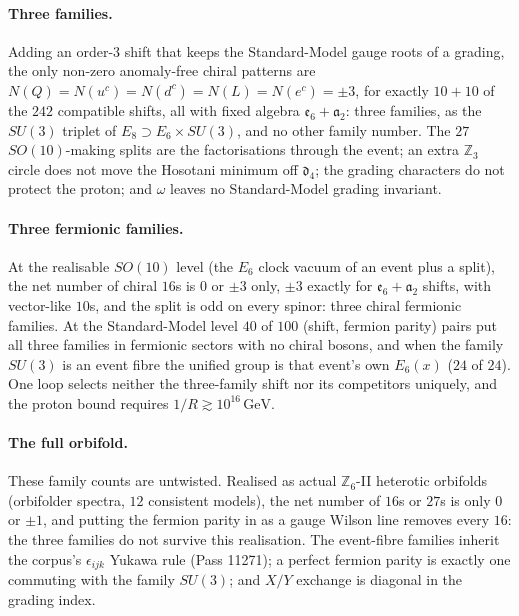 \paragraph{Three families.}
Adding an order-$3$ shift that keeps the Standard-Model gauge roots of a grading, the only non-zero anomaly-free
chiral patterns are $N(Q)=N(u^c)=N(d^c)=N(L)=N(e^c)=\pm3$, for exactly $10+10$ of the $242$ compatible shifts, all with
fixed algebra $\mathfrak e_6+\mathfrak a_2$: three families, as the $SU(3)$ triplet of $E_8\supset E_6\times SU(3)$, and no other
family number.  The $27$ $SO(10)$-making splits are the factorisations through the event; an extra $\mathbb Z_3$
circle does not move the Hosotani minimum off $\mathfrak d_4$; the grading characters do not protect the proton;
and $\omega$ leaves no Standard-Model grading invariant. 

\paragraph{Three fermionic families.}
At the realisable $SO(10)$ level (the $E_6$ clock vacuum of an event plus a split), the net number of chiral $16$s is
$0$ or $\pm3$ only, $\pm3$ exactly for $\mathfrak e_6+\mathfrak a_2$ shifts, with vector-like $10$s, and the split is odd on every
spinor: three chiral fermionic families. At the Standard-Model level $40$ of $100$ (shift, fermion parity) pairs put
all three families in fermionic sectors with no chiral bosons, and when the family $SU(3)$ is an event fibre the
unified group is that event's own $E_6(x)$ ($24$ of $24$).  One loop selects neither the three-family
shift nor its competitors uniquely, and the proton bound requires $1/R\gtrsim10^{16}\,\mathrm{GeV}$. 

\paragraph{The full orbifold.}
These family counts are untwisted. Realised as actual $\mathbb Z_6$-II heterotic orbifolds (orbifolder spectra, $12$ consistent
models), the net number of $16$s or $27$s is only $0$ or $\pm1$, and putting the fermion parity in as a gauge Wilson line
removes every $16$: the three families do not survive this realisation.  The event-fibre families inherit the
corpus's $\epsilon_{ijk}$ Yukawa rule (Pass 11271); a perfect fermion parity is exactly one commuting with the family
$SU(3)$; and $X/Y$ exchange is diagonal in the grading index. 

